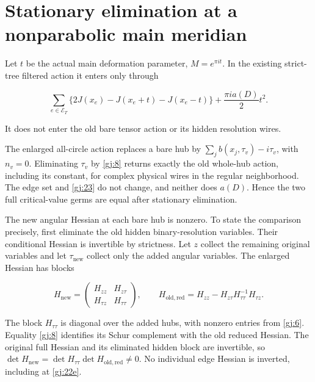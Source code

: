 \section{Stationary elimination at a nonparabolic main meridian}\label{gj:stationary-elimination-at-a-nonparabolic-main-meridian}

Let \(t\) be the actual main deformation parameter, \(M=e^{\pi it}\).
In the existing strict-tree filtered action it enters only through

\begin{equation}\label{gj:23}
\sum_{e\in\mathcal E_T}
       \{2J(x_e)-J(x_e+t)-J(x_e-t)\}
       +\frac{\pi i a(D)}2t^2.
\end{equation}

It does not enter the old bare tensor action or its hidden resolution wires.

The enlarged all-circle action replaces a bare hub by
\(\sum_jb(x_j,\tau_v)-i\tau_v\), with \(n_v=0\).
Eliminating \(\tau_v\) by \eqref{gj:8} returns exactly the old whole-hub action, including its constant, for complex physical wires in the regular neighborhood. The edge set and \eqref{gj:23} do not change, and neither does \(a(D)\). Hence the two full critical-value germs are equal after stationary elimination.

The new angular Hessian at each bare hub is nonzero. To state the
comparison precisely, first eliminate the old hidden binary-resolution
variables. Their conditional Hessian is invertible by strictness.
Let \(z\) collect the remaining original variables and let
\(\tau_{\mathrm{new}}\) collect only the added angular variables.
The enlarged Hessian has blocks

\begin{equation}\label{gj:23a}
H_{\mathrm{new}}=
 \begin{pmatrix}
 H_{zz}&H_{z\tau}\\ H_{\tau z}&H_{\tau\tau}
 \end{pmatrix},\qquad
 H_{\mathrm{old,red}}
   =H_{zz}-H_{z\tau}H_{\tau\tau}^{-1}H_{\tau z}.
\end{equation}

The block \(H_{\tau\tau}\) is diagonal over the added hubs, with
nonzero entries from \eqref{gj:6}. Equality \eqref{gj:8} identifies its Schur
complement with the old reduced Hessian. The original full Hessian
and its eliminated hidden block are invertible, so
\(\det H_{\mathrm{new}}
 =\det H_{\tau\tau}\det H_{\mathrm{old,red}}\ne0\).
No individual edge Hessian is inverted, including at \eqref{gj:22e}.

